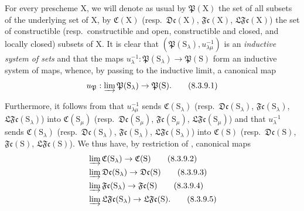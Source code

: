 \begin{env}[8.3.9]
\label{IV.8.3.9}
For every prescheme $\mathrm{X}$, we will denote as usual by $\mathfrak{P}(\mathrm{X})$ the set of all subsets of the underlying set of $\mathrm{X}$, by $\mathfrak{C}(\mathrm{X})$ (resp.\ $\mathfrak{Dc}(\mathrm{X})$, $\mathfrak{Fc}(\mathrm{X})$, $\mathfrak{LFc}(\mathrm{X})$) the set of constructible (resp.\ constructible and open, constructible and closed, and locally closed) subsets of $\mathrm{X}$.
It is clear that $(\mathfrak{P}(\mathrm{S}_\lambda),u_{\lambda\mu}^{-1})$ is an \emph{inductive system of sets} and that the maps $u_\lambda^{-1}:\mathfrak{P}(\mathrm{S}_\lambda)\to\mathfrak{P}(\mathrm{S})$ form an inductive system of maps, whence, by passing to the inductive limit, a canonical map
\begin{equation}
  u_\mathfrak{P}:\varinjlim\mathfrak{P}(\mathrm{S}_\lambda)\to\mathfrak{P}(\mathrm{S}).
  \tag{8.3.9.1}
\end{equation}

Furthermore, it follows from  that $u_{\lambda\mu}^{-1}$ sends $\mathfrak{C}(\mathrm{S}_\lambda)$ (resp.\ $\mathfrak{Dc}(\mathrm{S}_\lambda)$, $\mathfrak{Fc}(\mathrm{S}_\lambda)$, $\mathfrak{LFc}(\mathrm{S}_\lambda)$) into $\mathfrak{C}(\mathrm{S}_\mu)$ (resp.\ $\mathfrak{Dc}(\mathrm{S}_\mu)$, $\mathfrak{Fc}(\mathrm{S}_\mu)$, $\mathfrak{LFc}(\mathrm{S}_\mu)$) and that $u_\lambda^{-1}$ sends $\mathfrak{C}(\mathrm{S}_\lambda)$ (resp.\ $\mathfrak{Dc}(\mathrm{S}_\lambda)$, $\mathfrak{Fc}(\mathrm{S}_\lambda)$, $\mathfrak{LFc}(\mathrm{S}_\lambda)$) into $\mathfrak{C}(\mathrm{S})$ (resp.\ $\mathfrak{Dc}(\mathrm{S})$, $\mathfrak{Fc}(\mathrm{S})$, $\mathfrak{LFc}(\mathrm{S})$).
We thus have, by restriction of , canonical maps
\begin{align}
  &\varinjlim\mathfrak{C}(\mathrm{S}_\lambda)\to\mathfrak{C}(\mathrm{S}) \tag{8.3.9.2}\\
  &\varinjlim\mathfrak{Dc}(\mathrm{S}_\lambda)\to\mathfrak{Dc}(\mathrm{S}) \tag{8.3.9.3}\\
  &\varinjlim\mathfrak{Fc}(\mathrm{S}_\lambda)\to\mathfrak{Fc}(\mathrm{S}) \tag{8.3.9.4}\\
  &\varinjlim\mathfrak{LFc}(\mathrm{S}_\lambda)\to\mathfrak{LFc}(\mathrm{S}). \tag{8.3.9.5}
\end{align}
\end{env}

